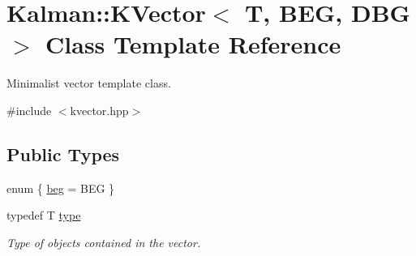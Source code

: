 \hypertarget{classKalman_1_1KVector}{}\section{Kalman\+:\+:K\+Vector$<$ T, B\+EG, D\+BG $>$ Class Template Reference}
\label{classKalman_1_1KVector}


Minimalist vector template class.  




{\ttfamily \#include $<$kvector.\+hpp$>$}

\subsection*{Public Types}
\begin{DoxyCompactItemize}
\item 
enum \{ \mbox{\hyperlink{classKalman_1_1KVector_a0865e45846b97a724e9624b4701c55e3a218fd05ffa54676f2ddb7d144030d5fc}{beg}} = B\+EG
 \}
\item 
\mbox{\label{classKalman_1_1KVector_a21dd883dad74658e5980b5de04806708}} 
typedef T \mbox{\hyperlink{classKalman_1_1KVector_a21dd883dad74658e5980b5de04806708}{type}}
\begin{DoxyCompactList}\small\item\em Type of objects contained in the vector. \end{DoxyCompactList}\end{DoxyCompactItemize}
